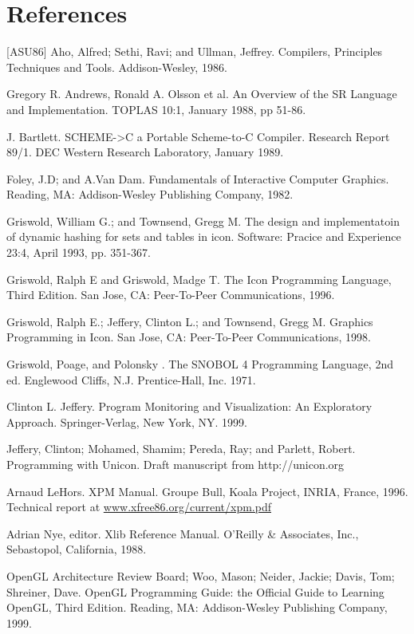 \clearpage\section{References}

[ASU86] Aho, Alfred; Sethi, Ravi; and Ullman, Jeffrey. Compilers,
Principles Techniques and Tools. Addison-Wesley, 1986.

\noindent
[Andrews88] Gregory R. Andrews, Ronald A. Olsson et al. An Overview of the SR
Language and Implementation. TOPLAS 10:1, January 1988, pp 51-86.

\noindent
[Bartlett 89] J. Bartlett. SCHEME-{\textgreater}C a Portable
Scheme-to-C Compiler. Research Report 89/1. DEC Western Research
Laboratory, January 1989.

\noindent
[Foley82] Foley, J.D; and A.Van Dam. Fundamentals of Interactive
Computer Graphics. Reading, MA: Addison-Wesley Publishing Company,
1982.

\noindent
[Griswold93] Griswold, William G.; and Townsend, Gregg M.
The design and implementatoin of dynamic hashing for sets
and tables in icon. Software: Pracice and Experience 23:4,
April 1993, pp. 351-367.

\noindent
[Griswold96] Griswold, Ralph E and Griswold, Madge T. The Icon
Programming Language, Third Edition. San Jose, CA: Peer-To-Peer
Communications, 1996.

\noindent
[Griswold98] Griswold, Ralph E.; Jeffery, Clinton L.; and Townsend,
Gregg M. Graphics Programming in Icon. San Jose, CA: Peer-To-Peer
Communications, 1998.

\noindent
[Griswold71] Griswold, Poage, and Polonsky . The SNOBOL 4 Programming
Language, 2nd ed. Englewood Cliffs, N.J.  Prentice-Hall, Inc. 1971.

\noindent
[Jeffery99] Clinton L. Jeffery. Program Monitoring and Visualization:
An Exploratory Approach.  Springer-Verlag, New York, NY. 1999.

\noindent
[Jeffery04] Jeffery, Clinton; Mohamed, Shamim; Pereda, Ray; and
Parlett, Robert. Programming with Unicon. Draft manuscript from
http://unicon.org

\noindent
[LeHors96] Arnaud LeHors. XPM Manual. Groupe Bull, Koala
Project, INRIA, France, 1996. Technical report at
\url{www.xfree86.org/current/xpm.pdf}

\noindent
[Nye88] Adrian Nye, editor. Xlib Reference Manual. O'Reilly \&
Associates, Inc., Sebastopol, California, 1988.

\noindent
[OpenGL99] OpenGL Architecture Review Board; Woo, Mason; Neider,
Jackie; Davis, Tom; Shreiner, Dave. OpenGL Programming Guide: the
Official Guide to Learning OpenGL, Third Edition. Reading, MA:
Addison-Wesley Publishing Company, 1999.

